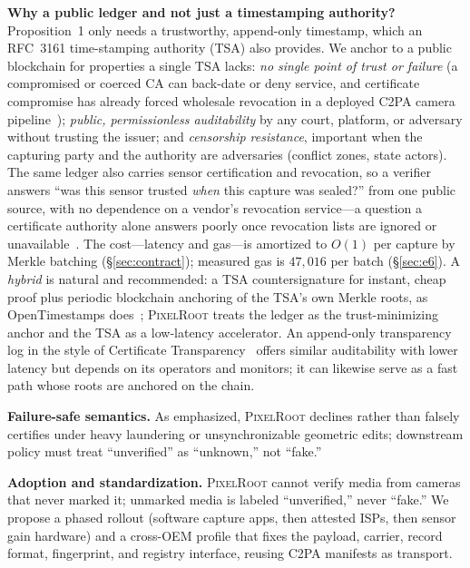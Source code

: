 \documentclass[journal]{IEEEtran}
\newcommand{\pr}{\textup{\textsc{PixelRoot}}}
\begin{document}
\else
\textbf{Why a public ledger and not just a timestamping authority?} Proposition~1
only needs a trustworthy, append-only timestamp, which an RFC~3161 time-stamping
authority (TSA) also provides. We anchor to a public blockchain for properties a
single TSA lacks: \emph{no single point of trust or failure} (a compromised or
coerced CA can back-date or deny service, and certificate compromise has already
forced wholesale revocation in a deployed C2PA camera
pipeline~\cite{c2pa2026security}); \emph{public, permissionless auditability} by any
court, platform, or adversary without trusting the issuer; and
\emph{censorship resistance}, important when the capturing party and the
authority are adversaries (conflict zones, state actors). The same ledger also
carries sensor certification and revocation, so a verifier answers ``was this
sensor trusted \emph{when} this capture was sealed?'' from one public source, with
no dependence on a vendor's revocation service---a question a certificate
authority alone answers poorly once revocation lists are ignored or
unavailable~\cite{c2pa2026security}. The cost---latency and gas---is amortized to
$O(1)$ per capture by Merkle batching (\S\ref{sec:contract}); measured gas is
$47{,}016$ per batch (\S\ref{sec:e6}).
A \emph{hybrid} is natural and recommended: a TSA countersignature for instant,
cheap proof plus periodic blockchain anchoring of the TSA's own Merkle roots, as
OpenTimestamps does~\cite{proofmode2023}; \pr{} treats the ledger as the
trust-minimizing anchor and the TSA as a low-latency accelerator. An append-only
transparency log in the style of Certificate Transparency~\cite{rfc6962} offers
similar auditability with lower latency but depends on its operators and
monitors; it can likewise serve as a fast path whose roots are anchored on the
chain.

\fi
\textbf{Failure-safe semantics.} As emphasized, \pr{} declines rather than
falsely certifies under heavy laundering or unsynchronizable geometric edits;
downstream policy must treat ``unverified'' as ``unknown,'' not ``fake.''

\ifshort
\textbf{Adoption and standardization.} \pr{} cannot verify media from cameras
that never marked it; unmarked media is labeled ``unverified,'' never ``fake.'' We
propose a phased rollout (software capture apps, then attested ISPs, then sensor
gain hardware) and a cross-OEM profile that fixes the payload, carrier, record
format, fingerprint, and registry interface, reusing C2PA manifests as transport.
\end{document}
